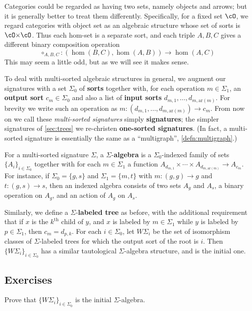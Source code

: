 \documentclass{book}
\def\ay{\mathrm{ar}}
\def\sig{\Sigma}
\let\map\hom
\let\hom\multimap
\begin{document}
Categories could be regarded as having two sets, namely objects and arrows; but it is generally better to treat them differently.
Specifically, for a fixed set $\cO$, we regard categories with object set \cO as an algebraic structure whose set of sorts is $\cO\times \cO$.
Thus each hom-set is a separate sort, and each triple $A,B,C$ gives a different binary composition operation
\[ \circ_{A,B,C} : (\map(B,C),\map(A,B)) \to \map(A,C) \]
This may seem a little odd, but as we will see it makes sense.

To deal with multi-sorted algebraic structures in general, we augment our signatures with a set $\sig_0$ of \textbf{sorts} together with, for each operation $m\in\sig_1$, an \textbf{output sort} $c_m\in\sig_0$ and also a list of \textbf{input sorts} $d_{m,1},\dots,d_{m,\ay(m)}$.
For brevity we write such an operation as $m:(d_{m,1},\dots,d_{m,\ay(m)}) \to c_m$.
From now on we call these \emph{multi-sorted signatures} simply \textbf{signatures}; the simpler signatures of \cref{sec:trees} we re-christen \textbf{one-sorted signatures}.
(In fact, a multi-sorted signature is essentially the same as a ``multigraph'', \cref{defn:multigraph}.)

For a multi-sorted signature $\sig$, a $\sig$-\textbf{algebra} is a $\sig_0$-indexed family of sets $\{A_i\}_{i\in\sig_0}$ together with for each $m\in\sig_1$ a function $A_{d_{m,1}}\times \cdots \times A_{d_{m,\ay(m)}} \to A_{c_m}$.
For instance, if $\sig_0 = \{g,s\}$ and $\sig_1=\{m,t\}$ with
$m : (g,g) \to g$ and $t : (g,s) \to s$,
then an indexed algebra consists of two sets $A_g$ and $A_s$, a binary operation on $A_g$, and an action of $A_g$ on $A_s$.

Similarly, we define a $\sig$-\textbf{labeled tree} as before, with the additional requirement that if $x$ is the $k^{\mathrm{th}}$ child of $y$, and $x$ is labeled by $m\in\sig_1$ while $y$ is labeled by $p\in\sig_1$, then $c_m = d_{p,k}$.
For each $i\in\sig_0$, let $W\sig_i$ be the set of isomorphism classes of $\sig$-labeled trees for which the output sort of the root is $i$.
Then $\{W\sig_i\}_{i\in\sig_0}$ has a similar tautological $\sig$-algebra structure, and is the initial one.

\subsection*{Exercises}

\begin{ex}
  Prove that $\{W\sig_i\}_{i\in\sig_0}$ is the initial $\sig$-algebra.
\end{ex}
\end{document}
